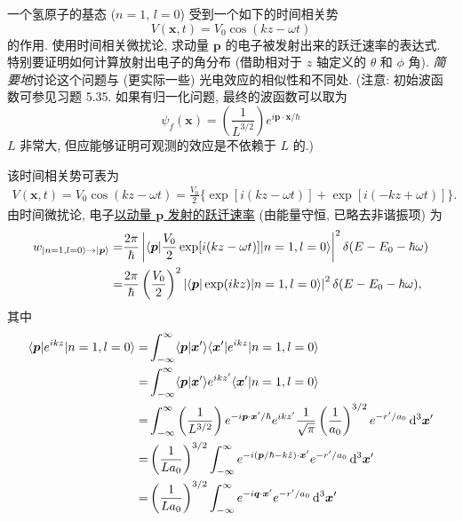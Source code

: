 \documentclass{assignment}
\begin{document}
\begin{prob}[课本习题 5.38]
    一个氢原子的基态 ($n=1$, $l=0$) 受到一个如下的时间相关势
    \[
        V(\bm{x},t)=V_0\cos(kz-\omega t)
    \]
    的作用. 使用时间相关微扰论, 求动量 $\bm{p}$ 的电子被发射出来的跃迁速率的表达式. 特别要证明如何计算放射出电子的角分布 (借助相对于 $z$ 轴定义的 $\theta$ 和 $\phi$ 角). \textit{简要地}讨论这个问题与 (更实际一些) 光电效应的相似性和不同处. (注意: 初始波函数可参见习题 5.35. 如果有归一化问题, 最终的波函数可以取为
    \[
        \psi_f(\bm{x})=\left(\frac{1}{L^{3/2}}\right)e^{i\bm{p}\cdot\bm{x}/\hbar}
    \]
    $L$ 非常大, 但应能够证明可观测的效应是不依赖于 $L$ 的.)
\end{prob}
\begin{sol}
    该时间相关势可表为
    \begin{align}
        V(\bm{x},t)=V_0\cos(kz-\omega t)=\frac{V_0}{2}\{\exp[i(kz-\omega t)]+\exp[i(-kz+\omega t)]\}.
    \end{align}
    由时间微扰论, 电子\uline{以动量 $\bm{p}$ 发射的跃迁速率} (由能量守恒, 已略去非谐振项) 为
    \begin{align}
        \notag w_{\lvert n=1,l=0\rangle\rightarrow\lvert\bm{p}\rangle}=&\frac{2\pi}{\hbar}\left\lvert\langle\bm{p}\rvert\frac{V_0}{2}\exp[i(kz-\omega t)]\lvert n=1,l=0\rangle\right\rvert^2\delta(E-E_0-\hbar\omega)\\
        \notag=&\frac{2\pi}{\hbar}\left(\frac{V_0}{2}\right)^2\left\lvert\langle\bm{p}\rvert\exp(ikz)\lvert n=1,l=0\rangle\right\rvert^2\delta(E-E_0-\hbar\omega),
    \end{align}
    其中
    \begin{align}
        \notag\langle\bm{p}\rvert e^{ikz}\lvert n=1,l=0\rangle=&\int_{-\infty}^{\infty}\langle\bm{p}\vert\bm{x}'\rangle\langle\bm{x}'\rvert e^{ikz}\lvert n=1,l=0\rangle\\
        \notag=&\int_{-\infty}^{\infty}\langle\bm{p}\vert\bm{x}'\rangle e^{ikz'}\langle\bm{x}'\vert n=1,l=0\rangle\\
        \notag=&\int_{-\infty}^{\infty}\left(\frac{1}{L^{3/2}}\right)e^{-i\bm{p}\cdot\bm{x}'/\hbar}e^{ikz'}\frac{1}{\sqrt{\pi}}\left(\frac{1}{a_0}\right)^{3/2}e^{-r'/a_0}\,\mathrm{d}^3\bm{x}'\\
        \notag=&\left(\frac{1}{La_0}\right)^{3/2}\int_{-\infty}^{\infty}e^{-i(\bm{p}/\hbar-k\hat{z})\cdot\bm{x}'}e^{-r'/a_0}\,\mathrm{d}^3\bm{x}'\\
        =&\left(\frac{1}{La_0}\right)^{3/2}\int_{-\infty}^{\infty}e^{-i\bm{q}\cdot\bm{x}'}e^{-r'/a_0}\,\mathrm{d}^3\bm{x}'
    \end{align}

\end{sol}
\end{document}
